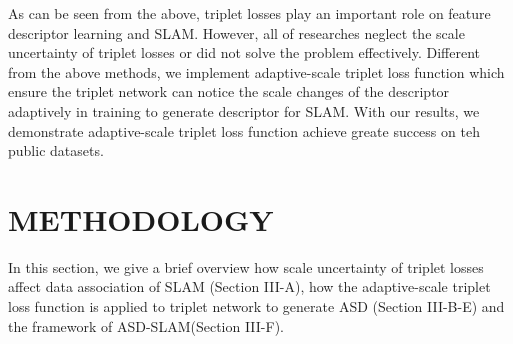 \documentclass[letterpaper, 10 pt, conference]{ieeeconf}  %
\begin{document}
As can be seen from the above, triplet losses play an important role on feature descriptor learning and SLAM. However, all of researches neglect the scale uncertainty of triplet losses or did not solve the problem effectively. Different from the above methods, we implement adaptive-scale triplet loss function which ensure the triplet network can notice the scale changes of the descriptor adaptively in training to generate descriptor for SLAM.  With our results, we demonstrate adaptive-scale triplet loss function achieve greate success on teh public datasets.

\section{METHODOLOGY}
In this section, we give a brief overview how scale uncertainty of triplet losses affect data association of SLAM (Section III-A), how the adaptive-scale triplet loss function is applied to triplet network to generate ASD (Section III-B-E) and the framework of ASD-SLAM(Section III-F).
\end{document}
